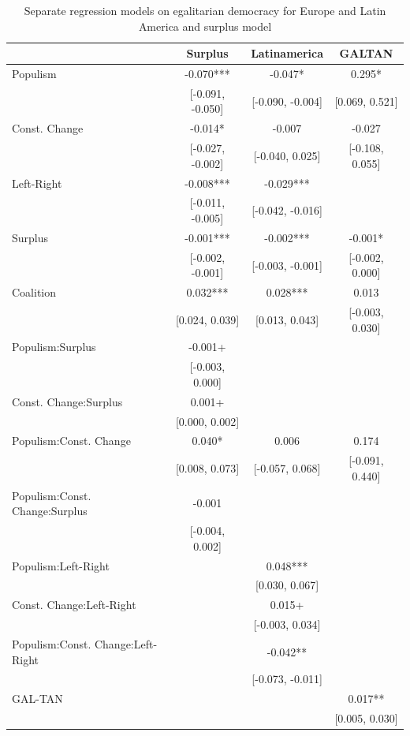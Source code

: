 \documentclass[
  abstract]{article}
\begin{document}
\hypertarget{tbl-egaldem_sep}{}
\begin{table}
\caption{\label{tbl-egaldem_sep}Separate regression models on egalitarian democracy for Europe and Latin
America and surplus model }\tabularnewline

\centering\centering\centering
\begin{tabular}[t]{lccc}
\toprule
  & Surplus & Latinamerica & GALTAN\\
\midrule
Populism & -0.070*** & -0.047* & 0.295*\\
 & {}[-0.091, -0.050] & {}[-0.090, -0.004] & {}[0.069, 0.521]\\
Const. Change & -0.014* & -0.007 & -0.027\\
 & {}[-0.027, -0.002] & {}[-0.040, 0.025] & {}[-0.108, 0.055]\\
Left-Right & -0.008*** & -0.029*** & \\
 & {}[-0.011, -0.005] & {}[-0.042, -0.016] & \\
Surplus & -0.001*** & -0.002*** & -0.001*\\
 & {}[-0.002, -0.001] & {}[-0.003, -0.001] & {}[-0.002, 0.000]\\
Coalition & 0.032*** & 0.028*** & 0.013\\
 & {}[0.024, 0.039] & {}[0.013, 0.043] & {}[-0.003, 0.030]\\
Populism:Surplus & -0.001+ &  & \\
 & {}[-0.003, 0.000] &  & \\
Const. Change:Surplus & 0.001+ &  & \\
 & {}[0.000, 0.002] &  & \\
Populism:Const. Change & 0.040* & 0.006 & 0.174\\
 & {}[0.008, 0.073] & {}[-0.057, 0.068] & {}[-0.091, 0.440]\\
Populism:Const. Change:Surplus & -0.001 &  & \\
 & {}[-0.004, 0.002] &  & \\
Populism:Left-Right &  & 0.048*** & \\
 &  & {}[0.030, 0.067] & \\
Const. Change:Left-Right &  & 0.015+ & \\
 &  & {}[-0.003, 0.034] & \\
Populism:Const. Change:Left-Right &  & -0.042** & \\
 &  & {}[-0.073, -0.011] & \\
GAL-TAN &  &  & 0.017**\\
 &  &  & {}[0.005, 0.030]\\

\end{tabular}
\end{table}
\end{document}
